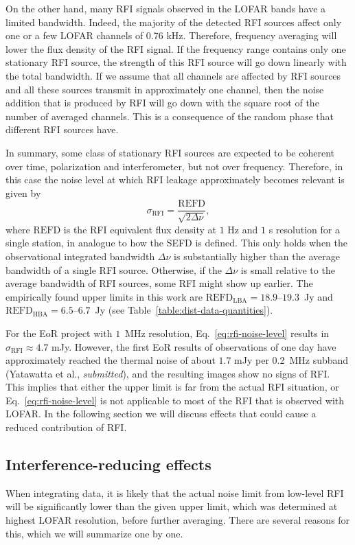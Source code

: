 \documentclass[useAMS,usenatbib]{mn2e}
\begin{document}
On the other hand, many RFI signals observed in the LOFAR bands have a limited bandwidth. Indeed, the majority of the detected RFI sources affect only one or a few LOFAR channels of 0.76 kHz. Therefore, frequency averaging will lower the flux density of the RFI signal. If the frequency range contains only one stationary RFI source, the strength of this RFI source will go down linearly with the total bandwidth. If we assume that all channels are affected by RFI sources and all these sources transmit in approximately one channel, then the noise addition that is produced by RFI will go down with the square root of the number of averaged channels. This is a consequence of the random phase that different RFI sources have.

In summary, some class of stationary RFI sources are expected to be coherent over time, polarization and interferometer, but not over frequency. Therefore, in this case the noise level at which RFI leakage approximately becomes relevant is given by
\begin{equation} \label{eq:rfi-noise-level}
 \sigma_\textrm{RFI} = \frac{\textrm{REFD}}{\sqrt{2 \Delta \nu}},
\end{equation}
where $\textrm{REFD}$ is the RFI equivalent flux density at $1$ Hz and $1$ s resolution for a single station, in analogue to how the SEFD is defined. This only holds when the observational integrated bandwidth $\Delta \nu$ is substantially higher than the average bandwidth of a single RFI source. Otherwise, if the $\Delta \nu$ is small relative to the average bandwidth of RFI sources, some RFI might show up earlier. The empirically found upper limits in this work are $\textrm{REFD}_\textrm{LBA}=18.9$--$19.3$~Jy and $\textrm{REFD}_\textrm{HBA}=6.5$--$6.7$~Jy (see Table~\ref{table:dist-data-quantities}).

For the EoR project with $1$~MHz resolution, Eq.~\ref{eq:rfi-noise-level} results in $\sigma_\textrm{RFI}\approx 4.7$ mJy. However, the first EoR results of observations of one day have approximately reached the thermal noise of about $1.7$ mJy per 0.2~MHz subband (Yatawatta et al., \textit{submitted}), and the resulting images show no signs of RFI. This implies that either the upper limit is far from the actual RFI situation, or Eq.~\ref{eq:rfi-noise-level} is not applicable to most of the RFI that is observed with LOFAR. In the following section we will discuss effects that could cause a reduced contribution of RFI.

\subsection{Interference-reducing effects} \label{sec:coherence-reduction}
When integrating data, it is likely that the actual noise limit from low-level RFI will be significantly lower than the given upper limit, which was determined at highest LOFAR resolution, before further averaging. There are several reasons for this, which we will summarize one by one.
\end{document}

